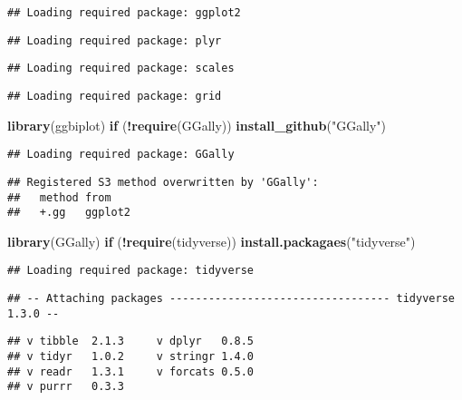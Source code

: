 \documentclass[]{article}
\newenvironment{Shaded}{\begin{snugshade}}{\end{snugshade}}
\newcommand{\ControlFlowTok}[1]{\textcolor[rgb]{0.13,0.29,0.53}{\textbf{#1}}}
\newcommand{\KeywordTok}[1]{\textcolor[rgb]{0.13,0.29,0.53}{\textbf{#1}}}
\newcommand{\NormalTok}[1]{#1}
\newcommand{\OperatorTok}[1]{\textcolor[rgb]{0.81,0.36,0.00}{\textbf{#1}}}
\newcommand{\StringTok}[1]{\textcolor[rgb]{0.31,0.60,0.02}{#1}}
\begin{document}
\begin{verbatim}
## Loading required package: ggplot2
\end{verbatim}

\begin{verbatim}
## Loading required package: plyr
\end{verbatim}

\begin{verbatim}
## Loading required package: scales
\end{verbatim}

\begin{verbatim}
## Loading required package: grid
\end{verbatim}

\begin{Shaded}
\begin{Highlighting}[]
\KeywordTok{library}\NormalTok{(ggbiplot)}
\ControlFlowTok{if}\NormalTok{ (}\OperatorTok{!}\KeywordTok{require}\NormalTok{(GGally)) }\KeywordTok{install_github}\NormalTok{(}\StringTok{"GGally"}\NormalTok{)}
\end{Highlighting}
\end{Shaded}

\begin{verbatim}
## Loading required package: GGally
\end{verbatim}

\begin{verbatim}
## Registered S3 method overwritten by 'GGally':
##   method from   
##   +.gg   ggplot2
\end{verbatim}

\begin{Shaded}
\begin{Highlighting}[]
\KeywordTok{library}\NormalTok{(GGally)}
\ControlFlowTok{if}\NormalTok{ (}\OperatorTok{!}\KeywordTok{require}\NormalTok{(tidyverse)) }\KeywordTok{install.packagaes}\NormalTok{(}\StringTok{"tidyverse"}\NormalTok{)}
\end{Highlighting}
\end{Shaded}

\begin{verbatim}
## Loading required package: tidyverse
\end{verbatim}

\begin{verbatim}
## -- Attaching packages ---------------------------------- tidyverse 1.3.0 --
\end{verbatim}

\begin{verbatim}
## v tibble  2.1.3     v dplyr   0.8.5
## v tidyr   1.0.2     v stringr 1.4.0
## v readr   1.3.1     v forcats 0.5.0
## v purrr   0.3.3
\end{verbatim}
\end{document}

